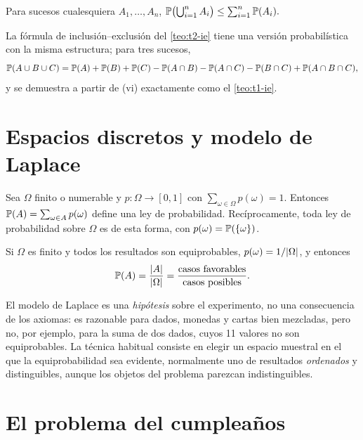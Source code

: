 \begin{teorema}\label{teo:t3-boole}
Para sucesos cualesquiera $A_1,\dots,A_n$,
\(
\mathbb{P}\bigl(\bigcup_{i=1}^{n}A_i\bigr)\le\sum_{i=1}^{n}\mathbb{P}(A_i).
\)
\end{teorema}

La fórmula de inclusión--exclusión del \cref{teo:t2-ie} tiene una versión probabilística con la misma estructura; para tres sucesos,
\[
\mathbb{P}(A\cup B\cup C)=\mathbb{P}(A)+\mathbb{P}(B)+\mathbb{P}(C)-\mathbb{P}(A\cap B)-\mathbb{P}(A\cap C)-\mathbb{P}(B\cap C)+\mathbb{P}(A\cap B\cap C),
\]
y se demuestra a partir de (vi) exactamente como el \cref{teo:t1-ie}.

\section{Espacios discretos y modelo de Laplace}

\begin{proposicion}\label{prop:t3-discreto}
Sea $\Omega$ finito o numerable y $p\colon\Omega\to[0,1]$ con $\sum_{\omega\in\Omega}p(\omega)=1$. Entonces $\mathbb{P}(A)=\sum_{\omega\in A}p(\omega)$ define una ley de probabilidad. Recíprocamente, toda ley de probabilidad sobre $\Omega$ es de esta forma, con $p(\omega)=\mathbb{P}(\{\omega\})$.
\end{proposicion}

\begin{definicion}\label{def:t3-laplace}
Si $\Omega$ es finito y todos los resultados son equiprobables, $p(\omega)=1/\lvert\Omega\rvert$, y entonces
\[
\mathbb{P}(A)=\frac{\lvert A\rvert}{\lvert\Omega\rvert}=\frac{\text{casos favorables}}{\text{casos posibles}}.
\]
\end{definicion}

El modelo de Laplace es una \emph{hipótesis} sobre el experimento, no una consecuencia de los axiomas: es razonable para dados, monedas y cartas bien mezcladas, pero no, por ejemplo, para la suma de dos dados, cuyos 11 valores no son equiprobables. La técnica habitual consiste en elegir un espacio muestral en el que la equiprobabilidad sea evidente, normalmente uno de resultados \emph{ordenados} y distinguibles, aunque los objetos del problema parezcan indistinguibles.

\addtocounter{definicion}{1}%

\section{El problema del cumpleaños}

